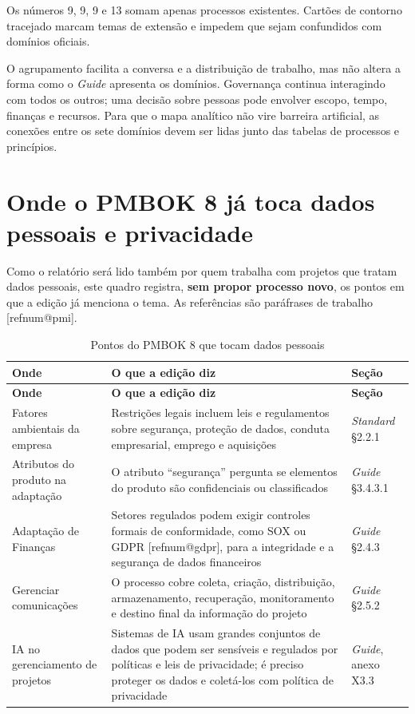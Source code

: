 \documentclass[11pt,a4paper]{article}
\makeatletter
\newcommand{\refnum}[1]{\csname refnum@#1\endcsname}
\newcommand{\cit}[1]{[\refnum{#1}]}
\newcommand{\SingleSpacing}{}
\newcommand{\fontetab}[1]{\par\vspace{3pt}{\small\noindent Fonte: #1\par}}
\makeatother
\begin{document}
Os números 9, 9, 9 e 13 somam apenas processos existentes. Cartões de contorno tracejado marcam temas de extensão e impedem que sejam confundidos com domínios oficiais.

O agrupamento facilita a conversa e a distribuição de trabalho, mas não altera a forma como o \textit{Guide} apresenta os domínios. Governança continua interagindo com todos os outros; uma decisão sobre pessoas pode envolver escopo, tempo, finanças e recursos. Para que o mapa analítico não vire barreira artificial, as conexões entre os sete domínios devem ser lidas junto das tabelas de processos e princípios.

\section{Onde o PMBOK 8 já toca dados pessoais e privacidade}

Como o relatório será lido também por quem trabalha com projetos que tratam dados pessoais, este quadro registra, \textbf{sem propor processo novo}, os pontos em que a edição já menciona o tema. As referências são paráfrases de trabalho [\refnum{pmi}].

\begingroup\SingleSpacing\small
\begin{longtable}{@{}>{\raggedright\arraybackslash}p{}>{\raggedright\arraybackslash}p{}>{\raggedright\arraybackslash}p{}@{}}
\caption{Pontos do PMBOK 8 que tocam dados pessoais}\label{tab:t13}\\
\toprule
\textbf{Onde} & \textbf{O que a edição diz} & \textbf{Seção}\\
\midrule
\endfirsthead
\toprule
\textbf{Onde} & \textbf{O que a edição diz} & \textbf{Seção}\\
\midrule
\endhead
\bottomrule
\endfoot
\bottomrule
\endlastfoot
Fatores ambientais da empresa & Restrições legais incluem leis e regulamentos sobre segurança, proteção de dados, conduta empresarial, emprego e aquisições & \textit{Standard} §2.2.1\\[3pt]
Atributos do produto na adaptação & O atributo \textquotedblleft{}segurança\textquotedblright{} pergunta se elementos do produto são confidenciais ou classificados & \textit{Guide} §3.4.3.1\\[3pt]
Adaptação de Finanças & Setores regulados podem exigir controles formais de conformidade, como SOX ou GDPR [\refnum{gdpr}], para a integridade e a segurança de dados financeiros & \textit{Guide} §2.4.3\\[3pt]
Gerenciar comunicações & O processo cobre coleta, criação, distribuição, armazenamento, recuperação, monitoramento e destino final da informação do projeto & \textit{Guide} §2.5.2\\[3pt]
IA no gerenciamento de projetos & Sistemas de IA usam grandes conjuntos de dados que podem ser sensíveis e regulados por políticas e leis de privacidade; é preciso proteger os dados e coletá-los com política de privacidade & \textit{Guide}, anexo X3.3\\[3pt]
\end{longtable}
\endgroup
\fontetab{Elaborado pelos autores (2026), com base em \cit{pmi}.}
\end{document}
